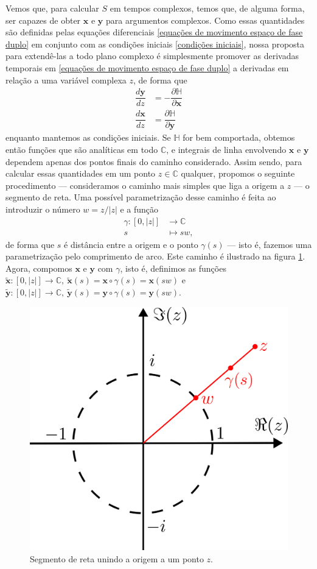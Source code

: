 \documentclass[
	12pt,
	oneside,			%
	a4paper,			%
	english,			%
	brazil				%
	]{abntex2}
\theoremstyle{definition}
\begin{document}
Vemos que, para calcular $S$ em tempos complexos, temos que, de alguma forma, ser capazes de obter $\mathbf{x}$ e $\mathbf{y}$ para argumentos complexos. Como essas quantidades são definidas pelas equações diferenciais \eqref{equações de movimento espaço de fase duplo} em conjunto com as condições iniciais \eqref{condições iniciais}, nossa proposta para extendê-las a todo plano complexo é simplesmente promover as derivadas temporais em \eqref{equações de movimento espaço de fase duplo} a derivadas em relação a uma variável complexa $z$, de forma que
\begin{equation}
    \begin{aligned}
        \dfrac{d \mathbf{y}}{dz} &= -\dfrac{\partial \mathbb{H}}{\partial \mathbf{x}} \\
        \dfrac{d \mathbf{x}}{dz} &= \dfrac{\partial \mathbb{H}}{\partial \mathbf{y}}
    \end{aligned}
\end{equation}
enquanto mantemos as condições iniciais. Se $\mathbb{H}$ for bem comportada, obtemos então funções que são analíticas em todo $\mathbb{C}$, e integrais de linha envolvendo $\mathbf{x}$ e $\mathbf{y}$ dependem apenas dos pontos finais do caminho considerado. Assim sendo, para calcular essas quantidades em um ponto $z \in \mathbb{C}$ qualquer, propomos o seguinte procedimento — consideramos o caminho mais simples que liga a origem a $z$ — o segmento de reta. Uma possível parametrização desse caminho é feita ao introduzir o número $w = z/|z|$ e a função
\begin{align*}
  \gamma \colon[0,|z|] &\to \mathbb{C}\\
  s &\mapsto  s w,
\end{align*}
de forma que $s$ é distância entre a origem e o ponto $\gamma(s)$ — isto é, fazemos uma parametrização pelo comprimento de arco. Este caminho é ilustrado na figura \ref{plano complexo}. Agora, compomos $\mathbf{x}$ e $\mathbf{y}$ com $\gamma$, isto é, definimos as funções $\tilde{\mathbf{x}}:[0,|z|]\to \mathbb{C}, \ \tilde{\mathbf{x}}(s) = \mathbf{x}\circ \gamma(s) = \mathbf{x}(sw)$ e $\tilde{\mathbf{y}}:[0,|z|]\to \mathbb{C}, \ \tilde{\mathbf{y}}(s) = \mathbf{y}\circ \gamma(s) = \mathbf{y}(sw)$. 
\begin{figure}[H]
    \includegraphics[width=.5\textwidth]{Imagens/plano_complexo.png}
    \centering
    \caption{Segmento de reta unindo a origem a um ponto $z$.}
    \label{plano complexo}
\end{figure}
\end{document}
